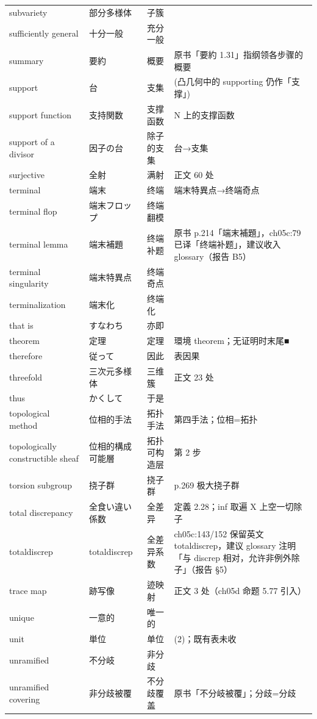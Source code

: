 \begin{longtable}{@{}>{\raggedright\arraybackslash}p{}>{\raggedright\arraybackslash}p{}>{\raggedright\arraybackslash}p{}>{\raggedright\arraybackslash}p{}@{}}
subvariety & 部分多様体 & 子簇 &  \\
sufficiently general & 十分一般 & 充分一般 &  \\
summary & 要約 & 概要 & 原书「要約 1.31」指纲领各步骤的概要 \\
support & 台 & 支集 & (凸几何中的 supporting 仍作「支撑」) \\
support function & 支持関数 & 支撑函数 & N 上的支撑函数 \\
support of a divisor & 因子の台 & 除子的支集 & 台→支集 \\
surjective & 全射 & 满射 & 正文 60 处 \\
terminal & 端末 & 终端 & 端末特異点→终端奇点 \\
terminal flop & 端末フロップ & 终端翻模 &  \\
terminal lemma & 端末補題 & 终端补题 & 原书 p.214「端末補題」，ch05c:79 已译「终端补题」，建议收入 glossary（报告 B5） \\
terminal singularity & 端末特異点 & 终端奇点 &  \\
terminalization & 端末化 & 终端化 &  \\
that is & すなわち & 亦即 &  \\
theorem & 定理 & 定理 & 環境 theorem；无证明时末尾■ \\
therefore & 従って & 因此 & 表因果 \\
threefold & 三次元多様体 & 三维簇 & 正文 23 处 \\
thus & かくして & 于是 &  \\
topological method & 位相的手法 & 拓扑手法 & 1.34 第四手法；位相=拓扑 \\
topologically constructible sheaf & 位相的構成可能層 & 拓扑可构造层 & 第 2 步 \\
torsion subgroup & 挠子群 & 挠子群 & p.269 极大挠子群 \\
total discrepancy & 全食い違い係数 & 全差异 & 定義 2.28；inf 取遍 X 上空一切除子 \\
totaldiscrep & totaldiscrep & 全差异系数 & ch05c:143/152 保留英文 totaldiscrep，建议 glossary 注明「与 discrep 相对，允许非例外除子」（报告 §5） \\
trace map & 跡写像 & 迹映射 & 正文 3 处（ch05d 命题 5.77 引入） \\
unique & 一意的 & 唯一的 &  \\
unit & 単位 & 单位 & 4.24(2)；既有表未收 \\
unramified & 不分岐 & 非分歧 &  \\
unramified covering & 非分歧被覆 & 不分歧覆盖 & 原书「不分岐被覆」；分歧=分歧 \\

\end{longtable}
